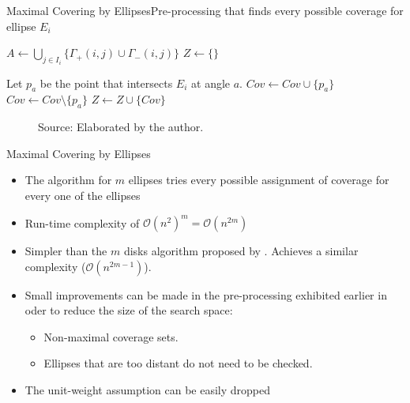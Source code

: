 \documentclass{beamer}
\newcommand{\Pp}{\mathscr{P}}
\newcommand{\bigO}{\mathscr{O}}
\newcommand{\source}[1]{\caption*{Source: {#1}} }
\begin{document}
\begin{frame}[fragile]{Maximal Covering by Ellipses}{Pre-processing that finds every possible coverage for ellipse $E_i$}
	\begin{algorithm}[H]
		\begin{algorithmic}[1]
			\STATE $A \gets \bigcup_{j \in I_i} \{\Gamma_+(i,j) \cup \Gamma_-(i,j)\}$
			\STATE $Z \gets \{\}$
			
			\STATE Let $p_a$ be the point that intersects $E_i$ at angle $a$. 
			\STATE $Cov \gets Cov \cup \{p_a\}$
			\ELSE
			\STATE $Cov \gets Cov \setminus \{p_a\}$
			\ENDIF
			\STATE $Z \gets Z \cup \{Cov\}$
			\ENDFOR
			\ENDFOR
			
		\end{algorithmic}
	\end{algorithm}
\end{frame}

\begin{frame}
	\begin{figure}
		\caption{Optimal solution with two ellipses for a random instance.}
		
		\source{Elaborated by the author.}
	\end{figure}
\end{frame}

\begin{frame}{Maximal Covering by Ellipses}
	
	\begin{itemize}
		\item The algorithm for $m$ ellipses tries every possible assignment of coverage for every one of the ellipses
		\item Run-time complexity of $\bigO(n^2)^m = \bigO(n^{2m})$
		
		\item Simpler than the $m$ disks algorithm proposed by \autocite{cabello:2006}. Achieves a similar complexity ($\bigO(n^{2m-1})$).
		
		\item Small improvements can be made in the pre-processing exhibited earlier in oder to reduce the size of the search space:
		\begin{itemize}
			\item Non-maximal coverage sets.
			\item Ellipses that are too distant do not need to be checked.
		\end{itemize}
	
		\item The unit-weight assumption can be easily dropped
	\end{itemize}
	
\end{frame}
\end{document}
